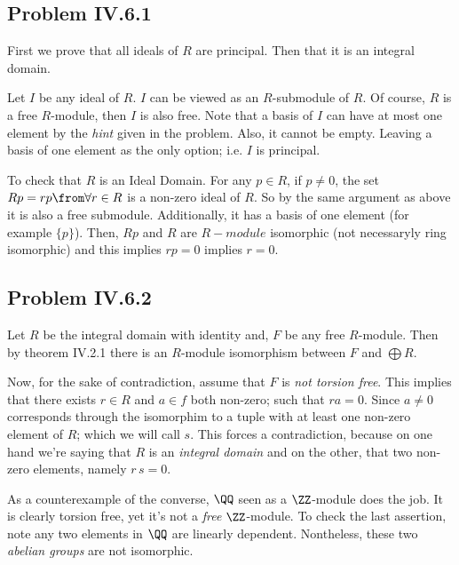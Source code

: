 \subsection*{Problem IV.6.1}
First we prove that all ideals of $R$ are principal. Then that it is an integral domain. 

Let $I$ be any ideal of $R$. $I$ can be viewed as an $R$-submodule of $R$. 
Of course, $R$ is a free $R$-module, then $I$ is also free.
Note that a basis of $I$ can have at most one element by the \emph{hint} given in the problem. 
Also, it cannot be empty. Leaving a basis of one element as the only option; i.e. $I$ is principal.

To check that $R$ is an Ideal Domain. 
For any $p\in R$, if $p\neq 0$, the set $Rp={rp\from \forall r\in R}$ is a non-zero ideal of $R$. 
So by the same argument as above it is also a free submodule. Additionally, it 
has a basis of one element (for example $\{p \}$). 
Then, $Rp$ and $R$  are $R-module$ isomorphic (not necessaryly ring isomorphic) and this implies $rp=0$ implies $r=0$.

\subsection*{Problem IV.6.2}
Let $R$ be the integral domain with identity and, $F$ be any free $R$-module. 
Then by theorem IV.2.1 there is an $R$-module isomorphism between $F$ and $\bigoplus R$. 

Now, for the sake of contradiction, assume that $F$ is \emph{not torsion free}. This implies that there exists $r\in R$ and $a\in f$ both non-zero; such that $ra=0$.
 Since $a\neq 0$ corresponds through the isomorphim to a tuple with at least one non-zero element of $R$; which we will call $s$. 
This forces a contradiction, because on one hand we're saying that $R$ is an \emph{integral domain} and on the other, that two non-zero elements, namely $r\,s =0$. 

As a counterexample of the converse,  $\QQ$ seen as a $\ZZ$-module does the job. 
It is clearly torsion free, yet it's not a \emph{free} $\ZZ$-module.
To check the last assertion, note any two elements in $\QQ$ are linearly dependent. 
Nontheless, these two \emph{abelian groups} are not isomorphic.
